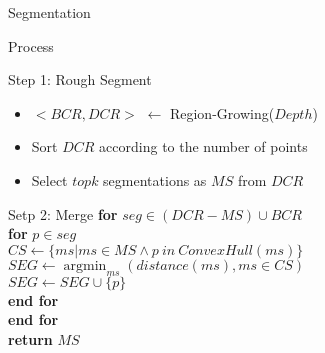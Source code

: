 \documentclass[xcolor=table,compress,blue]{beamer}
\begin{document}
\begin{frame}{Segmentation}
	\begin{exampleblock}{Process}
	\end{exampleblock}
	\vspace{-20pt}
	\begin{exampleblock}{\small{Step 1: Rough Segment}}
		\begin{itemize}
			\item $<BCR, DCR>$ $\leftarrow$ Region-Growing($Depth$)
			\item Sort $DCR$ according to the number of points
			\item Select $topk$ segmentations as $MS$ from $DCR$
		\end{itemize}
	\end{exampleblock}
	\vspace{-15pt}
	\begin{exampleblock}{\small{Setp 2: Merge}}
		\textbf{for} {$seg \in  (DCR - MS) \cup BCR$}
		\\ \quad \textbf{for} {$p \in seg$}
		\\ \quad \quad $CS \leftarrow \{ms|ms \in MS \wedge p\ in\ ConvexHull(ms)\}$
		\\ \quad \quad $SEG \leftarrow \mathop{\arg\min}_{ms}(distance(ms), ms\in CS)$	
		\\ \quad \quad $SEG \leftarrow SEG \cup \{p\}$
  \\ \quad \textbf{end for}
		\\ \textbf{end for} 
		\\ \textbf{return} $MS$
	\end{exampleblock}

\end{frame}
\end{document}
